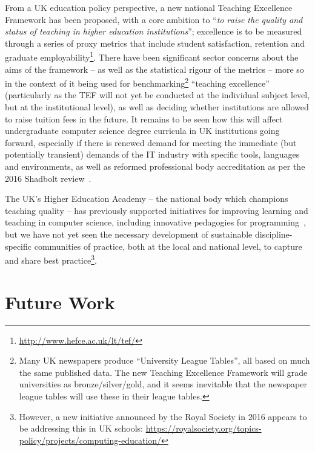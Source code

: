 \documentclass[english]{programming}
\begin{document}
From a UK education policy perspective, a new national Teaching
Excellence Framework has been proposed, with a core ambition to
``{\emph{to raise the quality and status of teaching in higher
education institutions}}''; excellence is to be measured through a
series of proxy metrics that include student satisfaction, retention
and graduate
employability\footnote{\url{http://www.hefce.ac.uk/lt/tef/}}. There
have been significant sector concerns about the aims of the framework
-- as well as the statistical rigour of the metrics -- more so in the
context of it being used for benchmarking\footnote{Many UK newspapers
produce ``University League Tables'', all based on much the same
published data. The new Teaching Excellence Framework will grade
universities as bronze/silver/gold, and it seems inevitable that the
newspaper league tables will use these in their league tables.} 
``teaching excellence'' (particularly as the TEF will not yet be
conducted at the individual subject level, but at the institutional
level), as well as deciding whether institutions are allowed to raise
tuition fees in the future. It remains to be seen how this will affect
undergraduate computer science degree curricula in UK institutions
going forward, especially if there is renewed demand for meeting the
immediate (but potentially transient) demands of the IT industry with
specific tools, languages and environments, as well as reformed
professional body accreditation as per the 2016 Shadbolt
review~\cite{shadbolt:2016}.

The UK's Higher Education Academy -- the national body which champions
teaching quality -- has previously supported initiatives for improving
learning and teaching in computer science, including innovative
pedagogies for
programming~\cite{crick-et-al-hea:2015,davenport-et-al:latice2016},
but we have not yet seen the necessary development of sustainable
discipline-specific communities of practice, both at the local and
national level, to capture and share best practice\footnote{However, a
new initiative announced by the Royal Society in 2016 appears to be
addressing this in UK schools:
\url{https://royalsociety.org/topics-policy/projects/computing-education/}}.

\section{Future Work}
\end{document}
